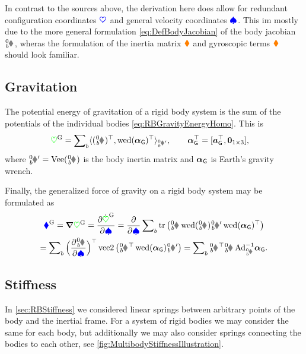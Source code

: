 In contrast to the sources above, the derivation here does allow for redundant configuration coordinates $\boldsymbol{\textcolor{blue}{\heartsuit}}$ and general velocity coordinates $\boldsymbol{\textcolor{blue}{\spadesuit}}$.
This im mostly due to the more general formulation \eqref{eq:DefBodyJacobian} of the body jacobian $\bodyJac{0}{\BidxII}$, wheras the formulation of the inertia matrix $\boldsymbol{\textcolor{orange}{\blacklozenge}}$ and gyroscopic terms $\boldsymbol{\textcolor{orange}{\blacklozenge}}$ should look familiar.

\subsection{Gravitation}
The potential energy of gravitation of a rigid body system is the sum of the potentials of the individual bodies \eqref{eq:RBGravityEnergyHomo}.
This is
\begin{align}\label{eq:RBSPotentialGravity}
 \potentialGravity
 &= \sumBodies \sProd[\bodyInertiaMatp{0}{\BidxII}]{(\bodyHomoCoord{0}{\BidxII})^\top}{\wedOp(\gravityAccWrench)^\top},
\qquad 
 \gravityAccWrench^\top = [\gravityAcc^\top, \tuple{0}_{1\times3} ],
\end{align}
where $\bodyInertiaMatp{0}{\BidxII} = \veeMatOp(\bodyInertiaMat{0}{\BidxII})$ is the body inertia matrix and $\boldsymbol{\alpha}_{\mathsf{G}}$ is Earth's gravity wrench.

Finally, the generalized force of gravity on a rigid body system may be formulated as
\begin{multline}\label{eq:RBSGenForceGravity}
 \genForceGravity = \differential\potentialGravity
 = \frac{\partial \potentialGravityd}{\partial \sysVel}
 = \frac{\partial}{\partial \sysVel} \sumBodies \tr\big( \bodyHomoCoord{0}{\BidxII} \wedOp(\bodyVel{0}{\BidxII}) \bodyInertiaMatp{0}{\BidxII} \wedOp(\gravityAccWrench)^\top \big)
\\ 
 = \sumBodies \Big(\frac{\partial \bodyVel{0}{\BidxII}}{\partial \sysVel}\Big)^\top \veeTwoOp\big( \bodyHomoCoord{0}{\BidxII}^\top \wedOp(\gravityAccWrench) \bodyInertiaMatp{0}{\BidxII} \big) 
 = \sumBodies \bodyJac{0}{\BidxII}^\top \bodyInertiaMat{0}{\BidxII} \, \Ad{\bodyHomoCoord{0}{\BidxII}}^{-1} \gravityAccWrench.
\end{multline}

\subsection{Stiffness}
In \autoref{sec:RBStiffness} we considered linear springs between arbitrary points of the body and the inertial frame.
For a system of rigid bodies we may consider the same for each body, but additionally we may also consider springs connecting the bodies to each other, see \autoref{fig:MultibodyStiffnessIllustration}.

